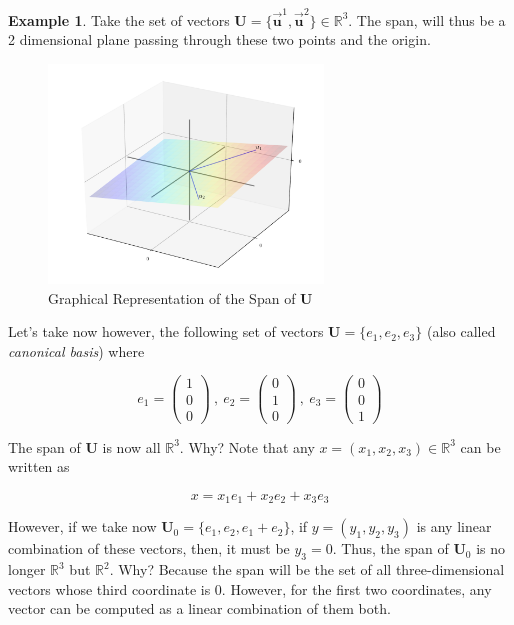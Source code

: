 \documentclass[a4paper,11pt]{article}
\theoremstyle{definition}
\newtheorem{example}{Example}
\theoremstyle{plain}
\begin{document}
\begin{example}
Take the set of vectors
\(\mathbf{U} = \{\vec{\mathbf{u}}^1, \vec{\mathbf{u}}^2\} \in\mathbb{R}^3\).
The span, will thus be a 2 dimensional plane passing through these two
points and the origin.

    \begin{figure}[htbp]
    	\centering 
    		\includegraphics[width = 0.65\textwidth]{Ch4_files/Ch4_13_0.pdf}
    		\caption{Graphical Representation of the Span of $\mathbf{U}$}
    		\label{fig:span_graph}
    \end{figure}
    
    Let's take now however, the following set of vectors
\(\mathbf{U} = \{e_1, e_2, e_3\}\) (also called \emph{canonical basis})
where

\[
e_1 = \begin{pmatrix} 1 \\ 0 \\ 0 \end{pmatrix} \: , \: e_2 = \begin{pmatrix} 0 \\ 1 \\ 0 \end{pmatrix} \: , \: e_3 = \begin{pmatrix}  0 \\ 0 \\ 1 \end{pmatrix}
\]

The span of \(\mathbf{U}\) is now all \(\mathbb{R}^3\). Why? Note that
any \(x = (x_1, x_2, x_3)\in\mathbb{R}^3\) can be written as

\[
x = x_1 e_1 + x_2 e_2 + x_3 e_3
\]

However, if we take now \(\mathbf{U}_0 = \{e_1, e_2, e_1 + e_2\}\), if
\(y = (y_1, y_2, y_3)\) is any linear combination of these vectors,
then, it must be \(y_3 = 0\). Thus, the span of \(\mathbf{U}_0\) is no
longer \(\mathbb{R}^3\) but \(\mathbb{R}^2\). Why? Because the span will
be the set of all three-dimensional vectors whose third coordinate is
\(0\). However, for the first two coordinates, any vector can be
computed as a linear combination of them both.


\end{example}
\end{document}
